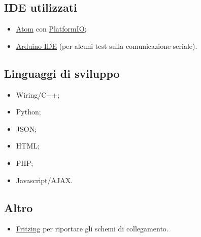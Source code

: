\subsection{IDE utilizzati}
\begin{itemize}
	\item \href{https://atom.io/}{Atom} con \href{ http://platformio.org/}{PlatformIO};
	\item \href{https://www.arduino.cc/en/Main/Software}{Arduino IDE} (per alcuni test sulla comunicazione seriale).
\end{itemize}

\subsection{Linguaggi di sviluppo}
\begin{itemize}
	\item Wiring/C++;
	\item Python;
	\item JSON;
	\item HTML;
	\item PHP;
	\item Javascript/AJAX.
\end{itemize}

\subsection{Altro}
\begin{itemize}
	\item \href{http://fritzing.org}{Fritzing} per riportare gli schemi di collegamento.
\end{itemize}